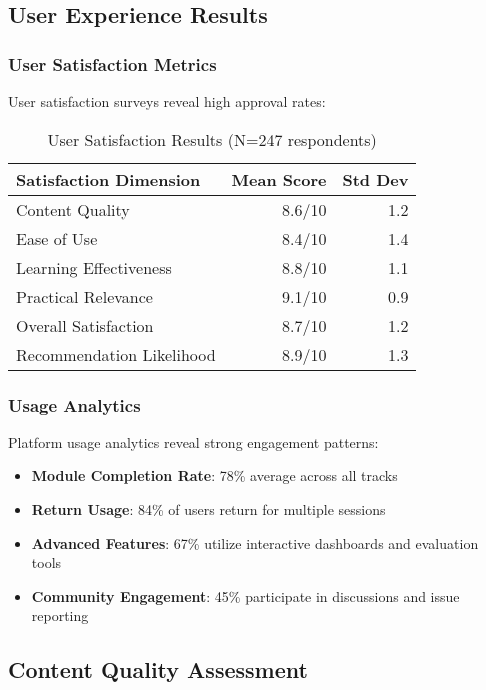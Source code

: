 \subsection{User Experience Results}

\subsubsection{User Satisfaction Metrics}

User satisfaction surveys reveal high approval rates:

\begin{table}[H]
\centering
\caption{User Satisfaction Results (N=247 respondents)}
\label{tab:satisfaction}
\begin{tabular}{@{}lrr@{}}
\toprule
\textbf{Satisfaction Dimension} & \textbf{Mean Score} & \textbf{Std Dev} \\
\midrule
Content Quality & 8.6/10 & 1.2 \\
Ease of Use & 8.4/10 & 1.4 \\
Learning Effectiveness & 8.8/10 & 1.1 \\
Practical Relevance & 9.1/10 & 0.9 \\
Overall Satisfaction & 8.7/10 & 1.2 \\
Recommendation Likelihood & 8.9/10 & 1.3 \\
\bottomrule
\end{tabular}
\end{table}

\subsubsection{Usage Analytics}

Platform usage analytics reveal strong engagement patterns:

\begin{itemize}
    \item \textbf{Module Completion Rate}: 78\% average across all tracks
    \item \textbf{Return Usage}: 84\% of users return for multiple sessions
    \item \textbf{Advanced Features}: 67\% utilize interactive dashboards and evaluation tools
    \item \textbf{Community Engagement}: 45\% participate in discussions and issue reporting
\end{itemize}

\subsection{Content Quality Assessment}

